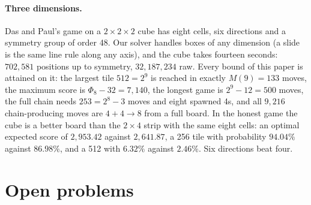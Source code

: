 \documentclass[11pt]{article}
\theoremstyle{definition}
\theoremstyle{remark}
\begin{document}
\paragraph{Three dimensions.} Das and Paul's game on a
$2\times2\times2$ cube has eight cells, six directions and a symmetry
group of order 48. Our solver handles boxes of any dimension (a slide is
the same line rule along any axis), and the cube takes fourteen seconds:
$702{,}581$ positions up to symmetry, $32{,}187{,}234$ raw. Every bound
of this paper is attained on it: the largest tile $512=2^{9}$ is reached
in exactly $M(9)=133$ moves, the maximum score is
$\Phi_8-32=7{,}140$, the longest game is $2^9-12=500$ moves, the full
chain needs $253=2^8-3$ moves and eight spawned 4s, and all $9{,}216$
chain-producing moves are $4+4\to8$ from a full board. In the honest
game the cube is a better board than the $2\times4$ strip with the same
eight cells: an optimal expected score of $2{,}953.42$ against
$2{,}641.87$, a 256 tile with probability $94.04\%$ against $86.98\%$,
and a 512 with $6.32\%$ against $2.46\%$. Six directions beat four.



\fussy


\section{Open problems}\label{sec:open}
\end{document}
